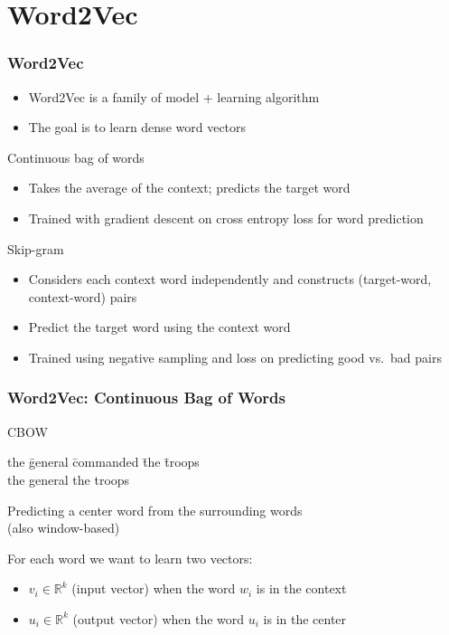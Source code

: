\section{Word2Vec}
\frame{\tableofcontents[currentsection]}

\begin{frame}
\frametitle{Word2Vec}
\begin{itemize}[<+->]
	\item Word2Vec is a family of model + learning algorithm
	\item The goal is to learn dense word vectors
\end{itemize}
\pause
\begin{alertblock}{Continuous bag of words}
	\begin{itemize}[<+->]
		\item Takes the average of the context; predicts the target word
		\item Trained with gradient descent on cross entropy loss for word prediction 
	\end{itemize}
\end{alertblock}
\pause
\begin{alertblock}{Skip-gram}
	\begin{itemize}[<+->]
		\item Considers each context word independently and constructs (target-word, context-word) pairs
		\item Predict the target word using the context word
		\item Trained using negative sampling and loss on predicting good vs.\ bad pairs
	\end{itemize}
\end{alertblock}
\end{frame}

\begin{frame}
\frametitle{Word2Vec: Continuous Bag of Words}
\begin{alertblock}{CBOW}
\begin{tabbing}
the \= general \= commanded \= the \= troops\kill \\
the \> general \> \rlap{\underline{\hphantom{commanded}}} \> the \> troops
\end{tabbing}
Predicting a center word from the surrounding words \\
(also window-based)
\end{alertblock}
\pause 
\begin{block}{For each word we want to learn two vectors:}
\begin{itemize}
	\item $v_i \in \mathbb{R}^k$ (input vector) when the word $w_i$ is in the context
	\item $u_i \in \mathbb{R}^k$ (output vector) when the word $u_i$ is in the center 
\end{itemize}
\end{block}
\end{frame}

